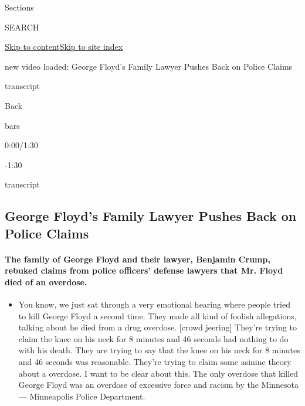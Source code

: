 Sections

SEARCH

\protect\hyperlink{site-content}{Skip to
content}\protect\hyperlink{site-index}{Skip to site index}

new video loaded: George Floyd's Family Lawyer Pushes Back on Police
Claims

transcript

Back

bars

0:00/1:30

-1:30

transcript

\hypertarget{george-floyds-family-lawyer-pushes-back-on-police-claims}{%
\subsection{George Floyd's Family Lawyer Pushes Back on Police
Claims}\label{george-floyds-family-lawyer-pushes-back-on-police-claims}}

\hypertarget{the-family-of-george-floyd-and-their-lawyer-benjamin-crump-rebuked-claims-from-police-officers-defense-lawyers-that-mr-floyd-died-of-an-overdose}{%
\paragraph{The family of George Floyd and their lawyer, Benjamin Crump,
rebuked claims from police officers' defense lawyers that Mr. Floyd died
of an
overdose.}\label{the-family-of-george-floyd-and-their-lawyer-benjamin-crump-rebuked-claims-from-police-officers-defense-lawyers-that-mr-floyd-died-of-an-overdose}}

\begin{itemize}
\tightlist
\item
  You know, we just sat through a very emotional hearing where people
  tried to kill George Floyd a second time. They made all kind of
  foolish allegations, talking about he died from a drug overdose.
  {[}crowd jeering{]} They're trying to claim the knee on his neck for 8
  minutes and 46 seconds had nothing to do with his death. They are
  trying to say that the knee on his neck for 8 minutes and 46 seconds
  was reasonable. They're trying to claim some asinine theory about a
  overdose. I want to be clear about this. The only overdose that killed
  George Floyd was an overdose of excessive force and racism by the
  Minnesota --- Minneapolis Police Department.
\end{itemize}

